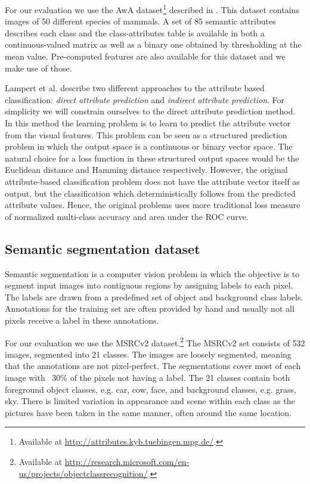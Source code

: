 For our evaluation we use the \acf{AwA} dataset\footnote{Available at \url{http://attributes.kyb.tuebingen.mpg.de/}.} described in \cite{lampert2009learning, lampert2014attribute}. This dataset contains images of 50 different species of mammals. A set of 85 semantic attributes describes each class and the class-attributes table is available in both a continuous-valued matrix as well as a binary one obtained by thresholding at the mean value. Pre-computed features are also available for this dataset and we make use of those.

Lampert et al. describe two different approaches to the attribute based classification: \emph{direct attribute prediction} and \emph{indirect attribute prediction}. For simplicity we will constrain ourselves to the direct attribute prediction method. In this method the learning problem is to learn to predict the attribute vector from the visual features. This problem can be seen as a structured prediction problem in which the output space is a continuous or binary vector space. The natural choice for a loss function in these structured output spaces would be the Euclidean distance and Hamming distance respectively. However, the original attribute-based classification problem does not have the attribute vector itself as output, but the classification which deterministically follows from the predicted attribute values. Hence, the original problems uses more traditional loss measure of normalized multi-class accuracy and area under the ROC curve.


\subsection{Semantic segmentation dataset}

Semantic segmentation is a computer vision problem in which the objective is to segment input images into contiguous regions by assigning labels to each pixel. The labels are drawn from a predefined set of object and background class labels. Annotations for the training set are often provided by hand and usually not all pixels receive a label in these annotations.

For our evaluation we use the \acf{MSRCv2} dataset.\footnote{Available at \url{http://research.microsoft.com/en-us/projects/objectclassrecognition/}.} The \ac{MSRCv2} set consists of 532 images, segmented into 21 classes. The images are loosely segmented, meaning that the annotations are not pixel-perfect. The segmentations cover most of each image with ~30\% of the pixels not having a label. The 21 classes contain both foreground object classes, e.g. car, cow, face, and background classes, e.g. grass, sky. There is limited variation in appearance and scene within each class as the pictures have been taken in the same manner, often around the same location.


